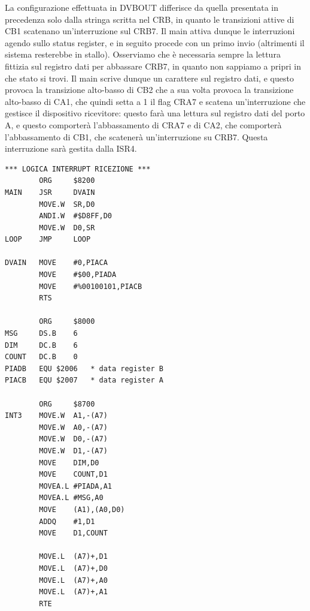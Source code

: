 La configurazione effettuata in DVBOUT differisce da quella presentata in precedenza solo dalla stringa scritta nel CRB, in quanto le transizioni attive di CB1 scatenano un'interruzione sul CRB7. Il main attiva dunque le interruzioni agendo sullo status register, e in seguito procede con un primo invio (altrimenti il sistema resterebbe in stallo). Osserviamo che è necessaria sempre la lettura fittizia sul registro dati per abbassare CRB7, in quanto non sappiamo a pripri in che stato si trovi. Il main scrive dunque un carattere sul registro dati, e questo provoca la transizione alto-basso di CB2 che a sua volta provoca la transizione alto-basso di CA1, che quindi setta a 1 il flag CRA7 e scatena un'interruzione che gestisce il dispositivo ricevitore: questo farà una lettura sul registro dati del porto A, e questo comporterà l'abbassamento di CRA7 e di CA2, che comporterà l'abbassamento di CB1, che scatenerà un'interruzione su CRB7. Questa interruzione sarà gestita dalla ISR4. 

\begin{lstlisting}
*** LOGICA INTERRUPT RICEZIONE ***
        ORG     $8200
MAIN    JSR     DVAIN 
        MOVE.W  SR,D0 
        ANDI.W  #$D8FF,D0 
        MOVE.W  D0,SR 
LOOP    JMP     LOOP 

DVAIN   MOVE    #0,PIACA
        MOVE    #$00,PIADA
        MOVE    #%00100101,PIACB
        RTS

        ORG     $8000
MSG     DS.B    6
DIM     DC.B    6
COUNT   DC.B    0
PIADB   EQU $2006   * data register B
PIACB   EQU $2007   * data register A

        ORG     $8700
INT3    MOVE.W  A1,-(A7)
        MOVE.W  A0,-(A7)
        MOVE.W  D0,-(A7)
        MOVE.W  D1,-(A7)
        MOVE    DIM,D0 
        MOVE    COUNT,D1 
        MOVEA.L #PIADA,A1 
        MOVEA.L #MSG,A0 
        MOVE    (A1),(A0,D0)
        ADDQ    #1,D1 
        MOVE    D1,COUNT

        MOVE.L  (A7)+,D1 
        MOVE.L  (A7)+,D0 
        MOVE.L  (A7)+,A0
        MOVE.L  (A7)+,A1 
        RTE
\end{lstlisting}

